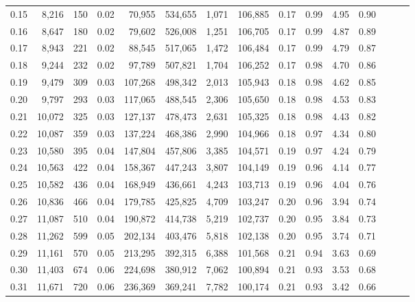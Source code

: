 \begin{tabular}{rrrrrrrrrrrrrrr}
0.15 &   8,216 &    150 &  0.02 &   70,955 &  534,655 &    1,071 &  106,885 &  0.17 &  0.99 &  4.95 &      0.90 \\
0.16 &   8,647 &    180 &  0.02 &   79,602 &  526,008 &    1,251 &  106,705 &  0.17 &  0.99 &  4.87 &      0.89 \\
0.17 &   8,943 &    221 &  0.02 &   88,545 &  517,065 &    1,472 &  106,484 &  0.17 &  0.99 &  4.79 &      0.87 \\
0.18 &   9,244 &    232 &  0.02 &   97,789 &  507,821 &    1,704 &  106,252 &  0.17 &  0.98 &  4.70 &      0.86 \\
0.19 &   9,479 &    309 &  0.03 &  107,268 &  498,342 &    2,013 &  105,943 &  0.18 &  0.98 &  4.62 &      0.85 \\
0.20 &   9,797 &    293 &  0.03 &  117,065 &  488,545 &    2,306 &  105,650 &  0.18 &  0.98 &  4.53 &      0.83 \\
0.21 &  10,072 &    325 &  0.03 &  127,137 &  478,473 &    2,631 &  105,325 &  0.18 &  0.98 &  4.43 &      0.82 \\
0.22 &  10,087 &    359 &  0.03 &  137,224 &  468,386 &    2,990 &  104,966 &  0.18 &  0.97 &  4.34 &      0.80 \\
0.23 &  10,580 &    395 &  0.04 &  147,804 &  457,806 &    3,385 &  104,571 &  0.19 &  0.97 &  4.24 &      0.79 \\
0.24 &  10,563 &    422 &  0.04 &  158,367 &  447,243 &    3,807 &  104,149 &  0.19 &  0.96 &  4.14 &      0.77 \\
0.25 &  10,582 &    436 &  0.04 &  168,949 &  436,661 &    4,243 &  103,713 &  0.19 &  0.96 &  4.04 &      0.76 \\
0.26 &  10,836 &    466 &  0.04 &  179,785 &  425,825 &    4,709 &  103,247 &  0.20 &  0.96 &  3.94 &      0.74 \\
0.27 &  11,087 &    510 &  0.04 &  190,872 &  414,738 &    5,219 &  102,737 &  0.20 &  0.95 &  3.84 &      0.73 \\
0.28 &  11,262 &    599 &  0.05 &  202,134 &  403,476 &    5,818 &  102,138 &  0.20 &  0.95 &  3.74 &      0.71 \\
0.29 &  11,161 &    570 &  0.05 &  213,295 &  392,315 &    6,388 &  101,568 &  0.21 &  0.94 &  3.63 &      0.69 \\
0.30 &  11,403 &    674 &  0.06 &  224,698 &  380,912 &    7,062 &  100,894 &  0.21 &  0.93 &  3.53 &      0.68 \\
0.31 &  11,671 &    720 &  0.06 &  236,369 &  369,241 &    7,782 &  100,174 &  0.21 &  0.93 &  3.42 &      0.66 \\

\end{tabular}
